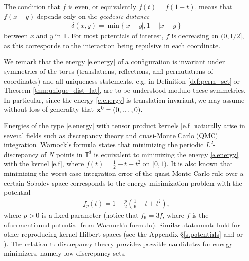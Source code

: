 \documentclass[a4paper,12pt]{article}
\numberwithin{equation}{section}
\theoremstyle{definition}
\begin{document}
The condition that $f$ is even, or equivalently $f(t) = f (1-t)$, means that $f (x - y)$ depends only on the \emph{geodesic distance}
\begin{align} \label{eq:geod_dist}
    \delta(x, y) = \min\{|x-y|, 1-|x-y|\}
\end{align}
between $x$ and $y$ in $\mathbb T$. %
For most potentials of interest, $f$ is decreasing on $(0,1/2]$, as this corresponds to the interaction being repulsive in each coordinate. 

 We remark that  the energy  \eqref{e.energy} of a configuration is invariant under symmetries of the torus (translations, reflections, and permutations of coordinates) and all uniqueness statements, e.g. in Definition \ref{def:perm_set} or Theorem \ref{thm:unique_dist_lat}, are to be understood modulo these symmetries.  In particular, since  the energy \eqref{e.energy} is translation invariant, we may assume without loss of generality  that ${\bf x}^0 = (0, \dots, 0)$.

Energies of the type \eqref{e.energy} with tensor product kernels \eqref{e.f} naturally arise in several fields such as discrepancy theory and quasi-Monte Carlo (QMC) integration. Warnock's formula \cite{HKP21, HO16, War72} states that minimizing the periodic $L^2$-discrepancy of $N$ points in $\mathbb T^d$ is equivalent to minimizing the  energy \eqref{e.energy} with the kernel \eqref{e.f}, where $f(t) = \frac12 - t + t^2$ on $[0,1)$. It is also known \cite{HO16, Nag25b}  that minimizing the worst-case integration error of the quasi-Monte Carlo rule over a certain Sobolev space corresponds to the energy minimization problem with the potential
\begin{align} \label{eq:qmc_potential}
    f_p(t) = 1 + \frac{p}{2} \left( \frac16 - t + t^2\right),
\end{align}
where $p > 0$ is a fixed parameter (notice that $f_6= 3f$, where $f$ is the aforementioned potential from Warnock's formula). Similar statements hold for other reproducing kernel Hilbert spaces (see the Appendix §\ref{s.potentials} and \cite{BD09, BT03} or \cite[§9]{NW10}). %
The relation to discrepancy theory provides possible candidates for  energy minimizers, namely low-discrepancy sets. %
\end{document}
